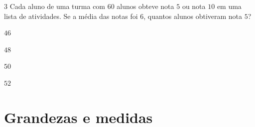 
\num{3}  Cada aluno de uma turma com $60$ alunos obteve nota $5$ ou nota $10$ em uma
lista de atividades. Se a média das notas foi $6$, quantos alunos
obtiveram nota $5$?

\begin{escolha}
\item $46$
\item $48$
\item $50$
\item $52$
\end{escolha}



\chapter{Grandezas e medidas}

